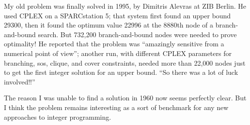 \bigskip
{}

My old problem was finally solved in 1995, by Dimitris Alevras at ZIB
Berlin. He used CPLEX on a SPARCstation 5; that system first found
an upper bound 29300, then it found the optimum value 22996 at the
8880th node of a branch-and-bound search. But 732,200 branch-and-bound
nodes were needed to prove optimality! He reported that the problem
was ``amazingly sensitive from a numerical point of view''; another run,
with different CPLEX parameters for branching, sos, clique, and cover
constraints, needed more than 22,000 nodes just to get the first
integer solution for an upper bound. ``So there was a lot of luck
involved!!''

The reason I was unable to find a solution in 1960 now seems perfectly
clear. But I think the problem remains interesting as a sort of benchmark
for any new approaches to integer programming.



\bye

